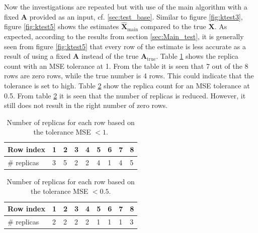 Now the investigations are repeated but with use of the main algorithm with a fixed $\mathbf{A}$ provided as an input, cf. \ref{sec:test_base}.
Similar to figure \ref{fig:ktest3}, figure \ref{fig:ktest5} shows the estimates $\hat{\mathbf{X}}_{\text{main}}$ compared to the true $\mathbf{X}$. 
As expected, according to the results from section \ref{sec:Main_test}, it is generally seen from figure \ref{fig:ktest5} that every row of the estimate is less accurate as a result of using a fixed $\mathbf{A}$ instead of the true $\mathbf{A}_{\text{true}}$. 
Table \ref{tab:replica5} shows the replica count with an MSE tolerance at 1. 
From the table it is seen that 7 out of the 8 rows are zero rows, while the true number is 4 rows. 
This could indicate that the tolerance is set to high. 
Table \ref{tab:replica6} show the replica count for an MSE tolerance at 0.5. 
From table \ref{tab:replica6} it is seen that the number of replicas is reduced.
However, it still does not result in the right number of zero rows.  
\begin{table}[H]
\center
\begin{tabular}{|l|l|l|l|l|l|l|l|l|}
\hline
Row index   & 1 & 2 & 3 & 4 & 5 & 6 & 7 & 8 \\ \hline
\# replicas & 3 & 5 & 2 & 2 & 4 & 1 & 4 & 5 \\ \hline
\end{tabular}
\caption{Number of replicas for each row based on the tolerance MSE $< 1$.}
\label{tab:replica5}
\end{table}
\noindent
\begin{table}[H]
\center
\begin{tabular}{|l|l|l|l|l|l|l|l|l|}
\hline
Row index   & 1 & 2 & 3 & 4 & 5 & 6 & 7 & 8 \\ \hline
\# replicas & 2 & 2 & 2 & 2 & 1 & 1 & 1 & 3 \\ \hline
\end{tabular}
\caption{Number of replicas for each row based on the tolerance MSE $< 0.5$.}
\label{tab:replica6}
\end{table}
\noindent
